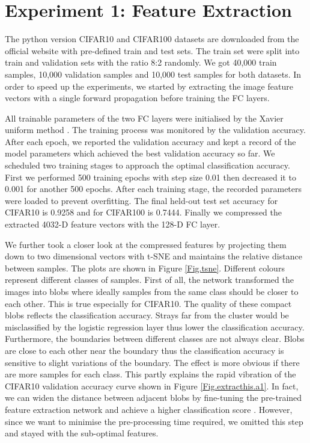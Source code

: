 \section{Experiment 1: Feature Extraction}
The python version CIFAR10 and CIFAR100 datasets are downloaded from the official website with pre-defined train and test sets. The train set were split into train and validation sets with the ratio 8:2 randomly. We got 40,000 train samples, 10,000 validation samples and 10,000 test samples for both datasets. In order to speed up the experiments, we started by extracting the image feature vectors with a single forward propagation before training the FC layers.

All trainable parameters of the two FC layers were initialised by the Xavier uniform method \cite{Glorot2010}. The training process was monitored by the validation accuracy. After each epoch, we reported the validation accuracy and kept a record of the model parameters which achieved the best validation accuracy so far. We scheduled two training stages to approach the optimal classification accuracy. First we performed 500 training epochs with step size 0.01 then decreased it to 0.001 for another 500 epochs.  After each training stage, the recorded parameters were loaded to prevent overfitting. The final held-out test set accuracy for CIFAR10 is 0.9258 and for CIFAR100 is 0.7444. Finally we compressed the extracted 4032-D feature vectors with the 128-D FC layer.

We further took a closer look at the compressed features by projecting them down to two dimensional vectors with t-SNE \cite{Maaten2008} and maintains the relative distance between samples. The plots are shown in Figure \ref{Fig.tsne}. Different colours represent different classes of samples. First of all, the network transformed the images into blobs where ideally samples from the same class should be closer to each other. This is true especially for CIFAR10. The quality of these compact blobs reflects the classification accuracy. Strays far from the cluster would be misclassified by the logistic regression layer thus lower the classification accuracy. Furthermore, the boundaries between different classes are not always clear. Blobs are close to each other near the boundary thus the classification accuracy is sensitive to slight variations of the boundary. The effect is more obvious if there are more samples for each class. This partly explains the rapid vibration of the CIFAR10 validation accuracy curve shown in Figure \ref{Fig.extracthis.a1}. In fact, we can widen the distance between adjacent blobs by fine-tuning the pre-trained feature extraction network and achieve a higher classification score \cite{Kornblith2018}. However, since we want to minimise the pre-processing time required, we omitted this step and stayed with the sub-optimal features.


